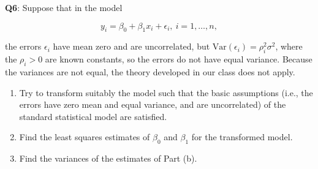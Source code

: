 \documentclass[]{article}
\begin{document}
\textbf{Q6}: Suppose that in the model

\[y_i= \beta_0+\beta_1x_i+\epsilon_i,\ i=1,\dots,n,\]

the errors \(\epsilon_i\) have mean zero and are uncorrelated, but
\(\mathrm{Var}(\epsilon_i) = \rho_i^2\sigma^2\), where the \(\rho_i>0\)
are known constants, so the errors do not have equal variance. Because
the variances are not equal, the theory developed in our class does not
apply.

\begin{enumerate}
\def\labelenumi{(\alph{enumi})}
\item
  Try to transform suitably the model such that the basic assumptions
  (i.e., the errors have zero mean and equal variance, and are
  uncorrelated) of the standard statistical model are satisfied.
\item
  Find the least squares estimates of \(\beta_0\) and \(\beta_1\) for
  the transformed model.
\item
  Find the variances of the estimates of Part (b).
\end{enumerate}
\end{document}
